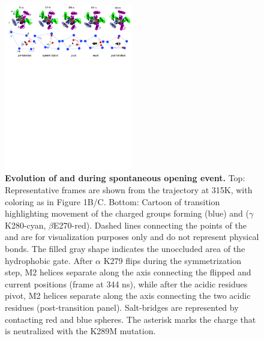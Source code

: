 \documentclass[9pt,twocolumn,twoside,lineno]{pnas-new}
\begin{document}
\begin{figure}[t]
\begin{center}
\includegraphics[width =0.5\textwidth]{figures_2/Cartoonv4}
\end{center}
\caption{{\bf Evolution of \triad and \fivering during spontaneous opening event.} Top: Representative frames are shown from the \WT trajectory at 315K, with coloring as in Figure 1B/C. Bottom: Cartoon of transition highlighting movement of the charged groups forming \fiveringnos (blue) and \triad ($\gamma$K280-cyan, $\beta$E270-red).  Dashed lines connecting the points of the \triad and \fivering are for visualization purposes only and do not represent physical bonds. The filled gray shape indicates the unoccluded area of the hydrophobic gate. After $\alpha$ K279 flips during the symmetrization step, M2 helices separate along the axis connecting the flipped and current positions (frame at 344 ns), while after the acidic residues pivot, M2 helices separate along the axis connecting the two acidic residues (post-transition panel). Salt-bridges are represented by contacting red and blue spheres. The asterisk marks the charge that is neutralized with the K289M mutation.} 
\label{fig:Pillar_2_graphs_network}
\end{figure}
\end{document}
